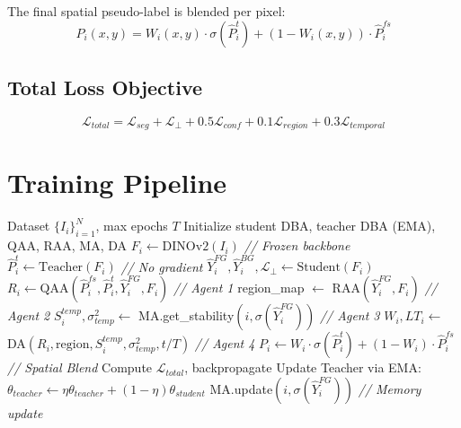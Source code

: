 \documentclass[journal,twoside,web]{IEEEtran}
\newcommand{\methodname}{UCOD-ADF}
\begin{document}
The final spatial pseudo-label is blended per pixel:
\begin{equation}
P_i(x,y) = W_i(x,y) \cdot \sigma(\hat{P}_i^t) + (1 - W_i(x,y)) \cdot \hat{P}_i^{fs}
\end{equation}

\subsection{Total Loss Objective}

\begin{equation}
\mathcal{L}_{total} = \mathcal{L}_{seg} + \mathcal{L}_\bot + 0.5 \mathcal{L}_{conf} + 0.1 \mathcal{L}_{region} + 0.3 \mathcal{L}_{temporal}
\end{equation}

\section{Training Pipeline}
\label{sec:pipeline}

\begin{algorithm}[h]
\caption{\methodname{} Training Procedure}
\label{alg:training}
\begin{algorithmic}[1]
\REQUIRE Dataset $\{I_i\}_{i=1}^N$, max epochs $T$
\STATE Initialize student DBA, teacher DBA (EMA), QAA, RAA, MA, DA
        \STATE $F_i \leftarrow \text{DINOv2}(I_i)$ \hfill \textit{// Frozen backbone}
        \STATE $\hat{P}_i^t \leftarrow \text{Teacher}(F_i)$ \hfill \textit{// No gradient}
        \STATE $\hat{Y}_i^{FG}, \hat{Y}_i^{BG}, \mathcal{L}_\bot \leftarrow \text{Student}(F_i)$
        \STATE $R_i \leftarrow \text{QAA}(\hat{P}_i^{fs}, \hat{P}_i^t, \hat{Y}_i^{FG}, F_i)$ \hfill \textit{// Agent 1}
        \STATE region\_map $\leftarrow$ RAA$(\hat{Y}_i^{FG}, F_i)$ \hfill \textit{// Agent 2}
        \STATE $S_i^{temp}, \sigma^2_{temp} \leftarrow$ MA.get\_stability$(i, \sigma(\hat{Y}_i^{FG}))$ \hfill \textit{// Agent 3}
        \STATE $W_i, LT_i \leftarrow$ DA$(R_i, \text{region}, S_i^{temp}, \sigma^2_{temp}, t/T)$ \hfill \textit{// Agent 4}
        \STATE $P_i \leftarrow W_i \cdot \sigma(\hat{P}_i^t) + (1-W_i) \cdot \hat{P}_i^{fs}$ \hfill \textit{// Spatial Blend}
        \STATE Compute $\mathcal{L}_{total}$, backpropagate
        \STATE Update Teacher via EMA: $\theta_{teacher} \leftarrow \eta \theta_{teacher} + (1-\eta) \theta_{student}$
        \STATE MA.update$(i, \sigma(\hat{Y}_i^{FG}))$ \hfill \textit{// Memory update}
    \ENDFOR
\ENDFOR
\end{algorithmic}
\end{algorithm}
\end{document}
